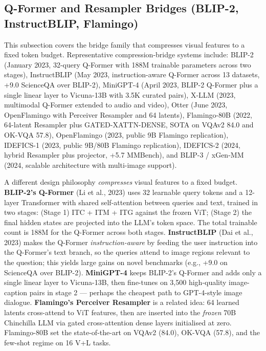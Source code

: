 \subsection{Q-Former and Resampler Bridges (BLIP-2, InstructBLIP, Flamingo)}\label{q-former-and-resampler-bridges-blip-2-instructblip-flamingo}

This subsection covers the bridge family that compresses visual features to a fixed token budget. Representative compression-bridge systems include: BLIP-2 (January 2023, 32-query Q-Former with 188M trainable parameters across two stages), InstructBLIP (May 2023, instruction-aware Q-Former across 13 datasets, +9.0 ScienceQA over BLIP-2), MiniGPT-4 (April 2023, BLIP-2 Q-Former plus a single linear layer to Vicuna-13B with 3.5K curated pairs), X-LLM (2023, multimodal Q-Former extended to audio and video), Otter (June 2023, OpenFlamingo with Perceiver Resampler and 64 latents), Flamingo-80B (2022, 64-latent Resampler plus GATED-XATTN-DENSE, SOTA on VQAv2 84.0 and OK-VQA 57.8), OpenFlamingo (2023, public 9B Flamingo replication), IDEFICS-1 (2023, public 9B/80B Flamingo replication), IDEFICS-2 (2024, hybrid Resampler plus projector, +5.7 MMBench), and BLIP-3 / xGen-MM (2024, scalable architecture with multi-image support).

A different design philosophy \emph{compresses} visual features to a fixed budget. \textbf{BLIP-2's Q-Former} (Li et al., 2023) uses 32 learnable query tokens and a 12-layer Transformer with shared self-attention between queries and text, trained in two stages: (Stage 1) ITC + ITM + ITG against the frozen ViT; (Stage 2) the final hidden states are projected into the LLM's token space. The total trainable count is 188M for the Q-Former across both stages. \textbf{InstructBLIP} (Dai et al., 2023) makes the Q-Former \emph{instruction-aware} by feeding the user instruction into the Q-Former's text branch, so the queries attend to image regions relevant to the question; this yields large gains on novel benchmarks (e.g., +9.0 on ScienceQA over BLIP-2). \textbf{MiniGPT-4} keeps BLIP-2's Q-Former and adds only a single linear layer to Vicuna-13B, then fine-tunes on 3,500 high-quality image-caption pairs in stage 2 --- perhaps the cheapest path to GPT-4-style image dialogue. \textbf{Flamingo's Perceiver Resampler} is a related idea: 64 learned latents cross-attend to ViT features, then are inserted into the \emph{frozen} 70B Chinchilla LLM via gated cross-attention dense layers initialised at zero. Flamingo-80B set the state-of-the-art on VQAv2 (84.0), OK-VQA (57.8), and the few-shot regime on 16 V+L tasks.

